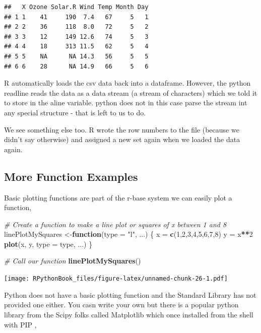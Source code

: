 \documentclass[]{book}
\newenvironment{Shaded}{\begin{snugshade}}{\end{snugshade}}
\newcommand{\KeywordTok}[1]{\textcolor[rgb]{0.13,0.29,0.53}{\textbf{#1}}}
\newcommand{\DataTypeTok}[1]{\textcolor[rgb]{0.13,0.29,0.53}{#1}}
\newcommand{\DecValTok}[1]{\textcolor[rgb]{0.00,0.00,0.81}{#1}}
\newcommand{\StringTok}[1]{\textcolor[rgb]{0.31,0.60,0.02}{#1}}
\newcommand{\CommentTok}[1]{\textcolor[rgb]{0.56,0.35,0.01}{\textit{#1}}}
\newcommand{\ControlFlowTok}[1]{\textcolor[rgb]{0.13,0.29,0.53}{\textbf{#1}}}
\newcommand{\OperatorTok}[1]{\textcolor[rgb]{0.81,0.36,0.00}{\textbf{#1}}}
\newcommand{\NormalTok}[1]{#1}
\theoremstyle{definition}
\theoremstyle{definition}
\theoremstyle{definition}
\theoremstyle{remark}
\begin{document}
\begin{verbatim}
##   X Ozone Solar.R Wind Temp Month Day
## 1 1    41     190  7.4   67     5   1
## 2 2    36     118  8.0   72     5   2
## 3 3    12     149 12.6   74     5   3
## 4 4    18     313 11.5   62     5   4
## 5 5    NA      NA 14.3   56     5   5
## 6 6    28      NA 14.9   66     5   6
\end{verbatim}

R automatically loads the csv data back into a dataframe. However, the
python readline reads the data as a data stream (a stream of characters)
which we told it to store in the aline variable. python does not in this
case parse the stream int any special structure - that is left to us to
do.

We see something else too. R wrote the row numbers to the file (because
we didn't say otherwise) and assigned a new set again when we loaded the
data again.

\subsection{More Function Examples}\label{more-function-examples}

Basic plotting functions are part of the r-base system we can easily
plot a function, 

\begin{Shaded}
\begin{Highlighting}[]
\CommentTok{# Create a function to make a line plot or squares of x between 1 and 8}
\NormalTok{linePlotMySquares <-}\ControlFlowTok{function}\NormalTok{(}\DataTypeTok{type =} \StringTok{"l"}\NormalTok{, ...) \{}
\NormalTok{  x =}\StringTok{ }\KeywordTok{c}\NormalTok{(}\DecValTok{1}\NormalTok{,}\DecValTok{2}\NormalTok{,}\DecValTok{3}\NormalTok{,}\DecValTok{4}\NormalTok{,}\DecValTok{5}\NormalTok{,}\DecValTok{6}\NormalTok{,}\DecValTok{7}\NormalTok{,}\DecValTok{8}\NormalTok{)}
\NormalTok{  y =}\StringTok{ }\NormalTok{x}\OperatorTok{**}\DecValTok{2}
  \KeywordTok{plot}\NormalTok{(x, y, }\DataTypeTok{type =}\NormalTok{ type, ...)}
\NormalTok{\}}

\CommentTok{# Call our function}
\KeywordTok{linePlotMySquares}\NormalTok{()}
\end{Highlighting}
\end{Shaded}

\texttt{[image: RPythonBook\_files/figure-latex/unnamed-chunk-26-1.pdf]}

Python does not have a basic plotting function and the Standard Library
has not provided one either. You casn write your own but there is a
popular python library from the Scipy  folks called
Matplotlib which once installed from the shell with PIP ,
\end{document}
